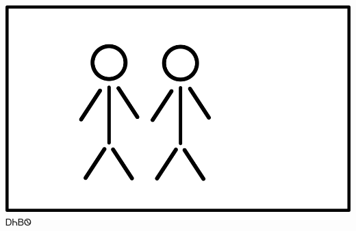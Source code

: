 \documentclass[avery5371]{flashcards}%
\begin{document}
    \begin{flashcard}{
        \includegraphics[width=0.95\columnwidth,height=.51\columnwidth,keepaspectratio]{../artwork/flags/aniyvwi-no-flag}
    }
        \Huge ᎠᏂᏴᏫ
    \end{flashcard}
\end{document}

